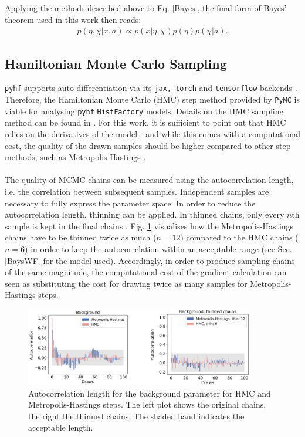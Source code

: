 \noindent Applying the methods described above to Eq. \eqref{Bayes}, the final form of Bayes' theorem used in this work then reads:
    \begin{align} \label{BayesConj}
        p(\eta, \chi \vert x, a) \propto p(x\vert \eta, \chi) p(\eta) p(\chi | a).
    \end{align}

    
\subsection{Hamiltonian Monte Carlo Sampling} 
\texttt{pyhf} supports auto-differentiation via its \texttt{jax, torch} and \texttt{tensorflow} backends \cite{pyhf, pyhf_joss, jax2018github, tensorflow2015-whitepaper, paszke2017automatic}. Therefore, the Hamiltonian Monte Carlo (HMC) step method provided by \texttt{PyMC} is viable for analysing \texttt{pyhf} \texttt{HistFactory} models. Details on the HMC sampling method can be found in \cite{vishnoi2021introduction}. For this work, it is sufficient to point out that HMC relies on the derivatives of the model - and while this comes with a computational cost, the quality of the drawn samples should be higher compared to other step methods, such as Metropolis-Hastings \cite{Metropolis1953}. \\ \\ 
\noindent The quality of MCMC chains can be measured using the autocorrelation length, i.e. the correlation between subsequent samples. Independent samples are necessary to fully express the parameter space. In order to reduce the autocorrelation length, thinning can be applied. In thinned chains, only every $n$th sample is kept in the final chains \cite{hoyer2017xarray}. Fig. \ref{autocorr} visualises how the Metropolis-Hastings chains have to be thinned twice as much ($n=12$) compared to the HMC chains ($n=6$) in order to keep the autocorrelation within an acceptable range (see Sec. \ref{BaysWF} for the model used). Accordingly, in order to produce sampling chains of the same magnitude, the computational cost of the gradient calculation can seen as substituting the cost for drawing twice as many samples for Metropolis-Hastings steps. 
    \begin{figure}[H] 
        \centering
        \includegraphics[width=10cm]{graphics/autocorr.png}
        \centering
        \caption{Autocorrelation length for the background parameter for HMC and Metropolis-Hastings steps. The left plot shows the original chains, the right the thinned chains. The shaded band indicates the acceptable length.}
        \label{autocorr}
    \end{figure}

